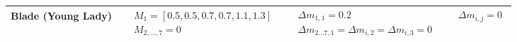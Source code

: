 \documentclass[twocolumn,10pt]{article}
\begin{document}
\begin{landscape}
\begin{longtable}{lccc}
Blade (Young Lady) &
$\begin{aligned}
& M_1 = [0.5, 0.5, 0.7, 0.7, 1.1, 1.3] \\
& M_{2,\dots,7} = 0
\end{aligned}$ &
$\begin{aligned}
& \Delta m_{1,1} = 0.2 \\
& \Delta m_{2\dots7,1} = \Delta m_{i,2} = \Delta m_{i,3} = 0
\end{aligned}$ &
$\begin{aligned}
& \Delta m_{i,j} = 0
\end{aligned}$ \\
\midrule


\end{longtable}
\end{landscape}
\end{document}
